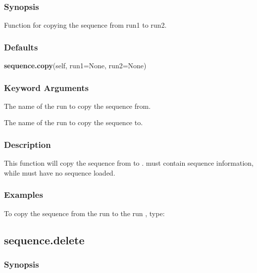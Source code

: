 \subsubsection{Synopsis}

Function for copying the sequence from run1 to run2.

\subsubsection{Defaults}

\textsf{\textbf{sequence.copy}(self, run1=None, run2=None)}


\subsubsection{Keyword Arguments}


  The name of the run to copy the sequence from.

  The name of the run to copy the sequence to.

\subsubsection{Description}

This function will copy the sequence from 
 to 
.  
 must contain sequence
information, while 
 must have no sequence loaded.


\subsubsection{Examples}

To copy the sequence from the run 
 to the run 
, type:





\newpage

\subsection{sequence.delete}


\subsubsection{Synopsis}

